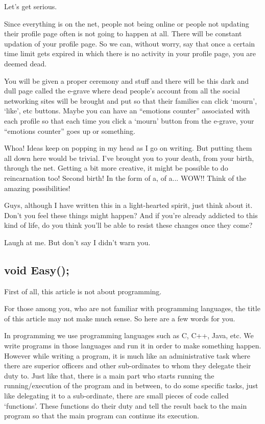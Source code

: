 \documentclass[twoside,11pt,titlepage]{article}
\begin{document}
Let's get serious.

Since everything is on the net, people not being online or people not updating their profile page often is not going to happen at all. There will be constant updation of your profile page. So we can, without worry, say that once a certain time limit gets expired in which there is no activity in your profile page, you are deemed dead.

You will be given a proper ceremony and stuff and there will be this dark and dull page called the e-grave where dead people's account from all the social networking sites will be brought and put so that their families can click `mourn', `like', etc buttons. Maybe you can have an ``emotions counter'' associated with each profile so that each time you click a `mourn' button from the e-grave, your ``emotions counter'' goes up or something.

Whoa! Ideas keep on popping in my head as I go on writing. But putting them all down here would be trivial. I've brought you to your death, from your birth, through the net. Getting a bit more creative, it might be possible to do reincarnation too! Second birth! In the form of a, of a... WOW!! Think of the amazing possibilities!

Guys, although I have written this in a light-hearted spirit, just think about it. Don't you feel these things might happen? And if you're already addicted to this kind of life, do you think you'll be able to resist these changes once they come?

Laugh at me. But don't say I didn't warn you.

\newpage
\begin{center}
  \section{void Easy();}
\end{center}
\bigskip
\bigskip
\bigskip

First of all, this article is not about programming.

For those among you, who are not familiar with programming languages, the title of this article may not make much sense. So here are a few words for you.

In programming we use programming languages such as C, C++, Java, etc. We write programs in those languages and run it in order to make something happen. However while writing a program, it is much like an administrative task where there are superior officers and other sub-ordinates to whom they delegate their duty to. Just like that, there is a main part who starts running the running/execution of the program and in between, to do some specific tasks, just like delegating it to a sub-ordinate, there are small pieces of code called `functions'. These functions do their duty and tell the result back to the main program so that the main program can continue its execution.
\end{document}
